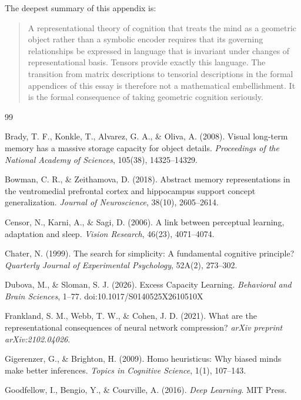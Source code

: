 \documentclass[12pt,a4paper]{article}
\begin{document}
The deepest summary of this appendix is:

\begin{quote}
A representational theory of cognition that treats the mind as a geometric object rather than a symbolic encoder requires that its governing relationships be expressed in language that is invariant under changes of representational basis. Tensors provide exactly this language. The transition from matrix descriptions to tensorial descriptions in the formal appendices of this essay is therefore not a mathematical embellishment. It is the formal consequence of taking geometric cognition seriously.
\end{quote}

\begin{thebibliography}{99}

Brady, T. F., Konkle, T., Alvarez, G. A., \& Oliva, A. (2008).
Visual long-term memory has a massive storage capacity for object details.
\textit{Proceedings of the National Academy of Sciences}, 105(38), 14325--14329.

Bowman, C. R., \& Zeithamova, D. (2018).
Abstract memory representations in the ventromedial prefrontal cortex and hippocampus support concept generalization.
\textit{Journal of Neuroscience}, 38(10), 2605--2614.

Censor, N., Karni, A., \& Sagi, D. (2006).
A link between perceptual learning, adaptation and sleep.
\textit{Vision Research}, 46(23), 4071--4074.

Chater, N. (1999).
The search for simplicity: A fundamental cognitive principle?
\textit{Quarterly Journal of Experimental Psychology}, 52A(2), 273--302.

Dubova, M., \& Sloman, S. J. (2026).
Excess Capacity Learning.
\textit{Behavioral and Brain Sciences}, 1--77.
doi:10.1017/S0140525X2610510X

Frankland, S. M., Webb, T. W., \& Cohen, J. D. (2021).
What are the representational consequences of neural network compression?
\textit{arXiv preprint arXiv:2102.04026}.

Gigerenzer, G., \& Brighton, H. (2009).
Homo heuristicus: Why biased minds make better inferences.
\textit{Topics in Cognitive Science}, 1(1), 107--143.

Goodfellow, I., Bengio, Y., \& Courville, A. (2016).
\textit{Deep Learning}.
MIT Press.


\end{thebibliography}
\end{document}

